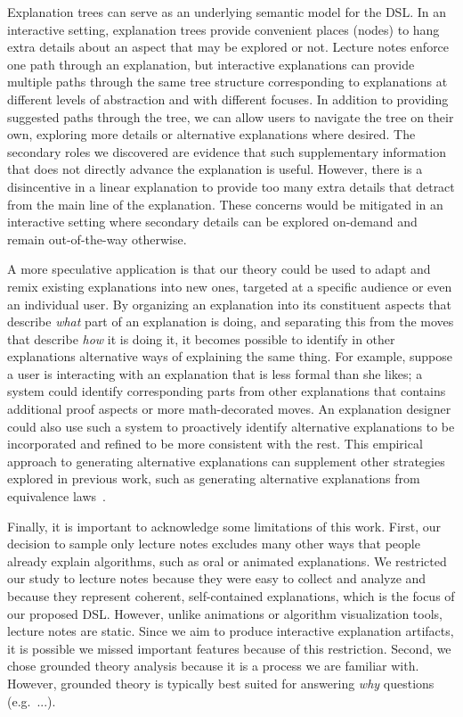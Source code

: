 \documentclass[sigconf]{acmart}
\begin{document}
Explanation trees can serve as an underlying semantic model for the DSL.
%
In an interactive setting, explanation trees provide convenient places (nodes)
to hang extra details about an aspect that may be explored or not. Lecture
notes enforce one path through an explanation, but interactive explanations can
provide multiple paths through the same tree structure corresponding to
explanations at different levels of abstraction and with different focuses. In
addition to providing suggested paths through the tree, we can allow users to
navigate the tree on their own, exploring more details or alternative
explanations where desired.
%
The secondary roles we discovered are evidence that such supplementary
information that does not directly advance the explanation is useful. However,
there is a disincentive in a linear explanation to provide too many extra
details that detract from the main line of the explanation. These concerns
would be mitigated in an interactive setting where secondary details can be
explored on-demand and remain out-of-the-way otherwise.


A more speculative application is that our theory could be used to adapt and
remix existing explanations into new ones, targeted at a specific audience or
even an individual user.
%
%
By organizing an explanation into its constituent aspects that describe
\emph{what} part of an explanation is doing, and separating this from the moves
that describe \emph{how} it is doing it, it becomes possible to identify in
other explanations alternative ways of explaining the same thing.
%
For example, suppose a user is interacting with an explanation that is less
formal than she likes; a system could identify corresponding parts from other
explanations that contains additional proof aspects or more math-decorated
moves. An explanation designer could also use such a system to proactively
identify alternative explanations to be incorporated and refined to be more
consistent with the rest.
%
This empirical approach to generating alternative explanations can supplement
other strategies explored in previous work, such as generating alternative
explanations from equivalence laws~\cite{EW13jvlc}.


Finally, it is important to acknowledge some limitations of this work. First,
our decision to sample only lecture notes excludes many other ways that people
already explain algorithms, such as oral or animated explanations. We
restricted our study to lecture notes because they were easy to collect and
analyze and because they represent coherent, self-contained explanations, which
is the focus of our proposed DSL. However, unlike animations or algorithm
visualization tools, lecture notes are static. Since we aim to produce
interactive explanation artifacts, it is possible we missed important features
because of this restriction.
%
Second, we chose grounded theory analysis because it is a process we are
familiar with. 
%
However, grounded theory is typically best suited for answering \emph{why}
questions (e.g.\ ...).
\end{document}
